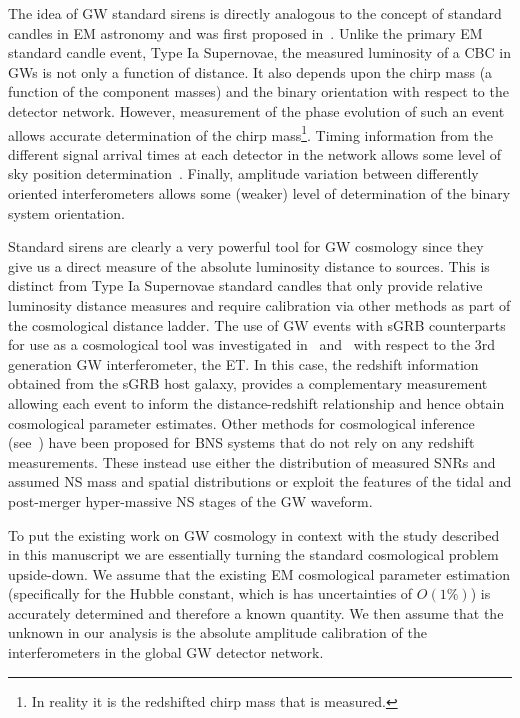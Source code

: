 \documentclass[prd, twocolumn, lengthcheck, superscriptaddress, showpacs, letterpaper, nofootinbib]{revtex4-1}
\begin{document}
The idea of \ac{GW} standard sirens is directly analogous to the concept of
standard candles in \ac{EM} astronomy and was first proposed
in~\cite{1986Natur.323..310S}. Unlike the primary \ac{EM} standard candle
event, Type Ia Supernovae, the measured luminosity of a \ac{CBC} in \acp{GW} is
not only a function of distance. It also depends upon the chirp mass (a
function of the component masses) and the binary orientation with respect to
the detector network. However, measurement of the phase evolution of such an
event allows accurate determination of the chirp mass\footnote{In reality it
is the redshifted chirp mass that is measured.}. Timing information from the
different signal arrival times at each detector in the network allows
some level of sky position determination~\cite{2014ApJ...795..105S}.
Finally, amplitude variation between differently oriented interferometers
allows some (weaker) level of determination of the binary system orientation.

Standard sirens are clearly a very powerful tool for \ac{GW} cosmology since
they give us a direct measure of the absolute luminosity distance to sources.
This is distinct from Type Ia Supernovae standard candles that only provide
relative luminosity distance measures and require calibration via other methods
as part of the cosmological distance ladder. The use of \ac{GW} events with
\ac{sGRB} counterparts for use as a cosmological tool was investigated
in~\cite{2010CQGra..27u5006S} and~\cite{2011PhRvD..83b3005Z} with respect to
the 3rd generation \ac{GW} interferometer, the \ac{ET}. In this case, the
redshift information obtained from the \ac{sGRB} host galaxy, provides a
complementary measurement allowing each event to inform the distance-redshift
relationship and hence obtain cosmological parameter estimates. Other methods
for cosmological inference (see~\cite{1996PhRvD..53.2878F,2012PhRvD..85b3535T,
2012PhRvD..86b3502T,Messenger:2011ux,2013arXiv1312.1862M}) have been proposed
for \ac{BNS} systems that do not rely on any redshift measurements. These
instead use either the distribution of measured \acp{SNR} and assumed \ac{NS}
mass and spatial distributions or exploit the features of the tidal and
post-merger hyper-massive \ac{NS} stages of the \ac{GW} waveform. 

To put the existing work on \ac{GW} cosmology in context with the study
described in this manuscript we are essentially turning the standard
cosmological problem upside-down. We assume that the existing \ac{EM}
cosmological parameter estimation (specifically for the Hubble constant, which is has 
uncertainties of $O(1\%)$) is
accurately determined and therefore a known quantity. We then assume that the
unknown in our analysis is the absolute amplitude calibration of the
interferometers in the global \ac{GW} detector network.    
\end{document}
